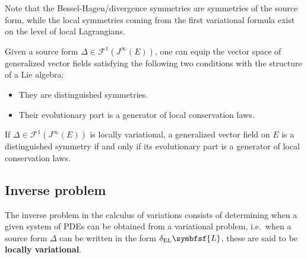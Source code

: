     \begin{remark}
        Note that the Bessel-Hagen/divergence symmetries are symmetries of the source form, while the local symmetries coming from the first variational formula exist on the level of local Lagrangians.
    \end{remark}

    \begin{property}
        Given a source form $\Delta\in\mathcal{F}^1(J^\infty(E))$, one can equip the vector space of generalized vector fields satisfying the following two conditions with the structure of a Lie algebra:
        \begin{itemize}
            \item They are distinguished symmetries.
            \item Their evolutionary part is a generator of local conservation laws.
        \end{itemize}
    \end{property}
    \begin{theorem}[Noether]
        If $\Delta\in\mathcal{F}^1(J^\infty(E))$ is locally variational, a generalized vector field on $E$ is a distinguished symmetry if and only if its evolutionary part is a generator of local conservation laws.
    \end{theorem}

\subsection{Inverse problem}\label{section:inverse_problem}

    The inverse problem in the calculus of variations consists of determining when a given system of PDEs can be obtained from a variational problem, i.e.~when a source form $\Delta$ can be written in the form $\delta_{\text{EL}}\symbfsf{L}$, these are said to be \textbf{locally variational}.


